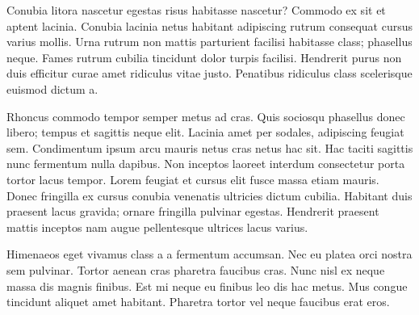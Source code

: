 Conubia litora nascetur egestas risus habitasse nascetur? Commodo ex sit et
aptent lacinia. Conubia lacinia netus habitant adipiscing rutrum consequat
cursus varius mollis. Urna rutrum non mattis parturient facilisi habitasse
class; phasellus neque. Fames rutrum cubilia tincidunt dolor turpis facilisi.
Hendrerit purus non duis efficitur curae amet ridiculus vitae justo. Penatibus
ridiculus class scelerisque euismod dictum a.

Rhoncus commodo tempor semper metus ad cras. Quis sociosqu phasellus donec
libero; tempus et sagittis neque elit. Lacinia amet per sodales, adipiscing
feugiat sem. Condimentum ipsum arcu mauris netus cras netus hac sit. Hac taciti
sagittis nunc fermentum nulla dapibus. Non inceptos laoreet interdum
consectetur porta tortor lacus tempor. Lorem feugiat et cursus elit fusce massa
etiam mauris. Donec fringilla ex cursus conubia venenatis ultricies dictum
cubilia. Habitant duis praesent lacus gravida; ornare fringilla pulvinar
egestas. Hendrerit praesent mattis inceptos nam augue pellentesque ultrices
lacus varius.

Himenaeos eget vivamus class a a fermentum accumsan. Nec eu platea orci nostra
sem pulvinar. Tortor aenean cras pharetra faucibus cras. Nunc nisl ex neque
massa dis magnis finibus. Est mi neque eu finibus leo dis hac metus. Mus congue
tincidunt aliquet amet habitant. Pharetra tortor vel neque faucibus erat eros.


